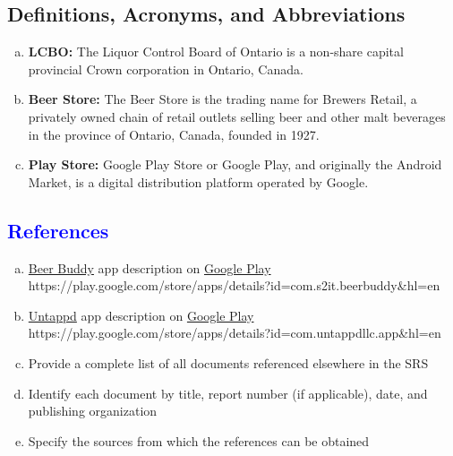 \documentclass[]{article}
\begin{document}
\subsection{Definitions, Acronyms, and Abbreviations}
\label{sub:definitions_acronyms_and_abbreviations}
\begin{enumerate}[a)]
	\item \textbf{LCBO: } The Liquor Control Board of Ontario is a non-share capital provincial Crown corporation in Ontario, Canada.
	\item \textbf{Beer Store: } The Beer Store is the trading name for Brewers Retail, a privately owned chain of retail outlets selling beer and other malt beverages in the province of Ontario, Canada, founded in 1927.
	\item \textbf{Play Store: } Google Play Store or Google Play, and originally the Android Market, is a digital distribution platform operated by Google.
\end{enumerate}

\subsection{\textcolor{blue}{References}}
\label{sub:references}
\begin{enumerate}[a)]
	\item \underline{Beer Buddy} app description on \underline{Google Play}  \\
https://play.google.com/store/apps/details?id=com.s2it.beerbuddy\&hl=en
	\item \underline{Untappd} app description on \underline{Google Play} \\
https://play.google.com/store/apps/details?id=com.untappdllc.app\&hl=en
	\\
	\item Provide a complete list of all documents referenced elsewhere in the SRS
	\item Identify each document by title, report number (if applicable), date, and publishing organization
	\item Specify the sources from which the references can be obtained
\end{enumerate}
\end{document}
